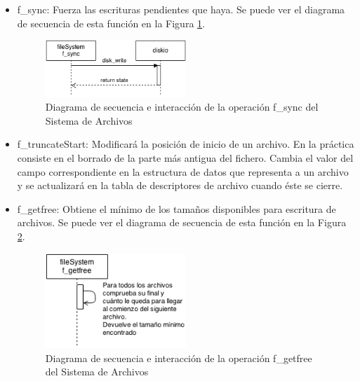 \begin{itemize}
\item f\_sync: Fuerza las escrituras pendientes que haya. Se puede ver el diagrama de secuencia de esta función en la Figura \ref{fig:fsync}.\\

\begin{figure}[!h]
\begin{center}
\includegraphics[width=0.5\textwidth]{figs/fsync.png}
\caption{Diagrama de secuencia e interacción de la operación f\_sync del Sistema de Archivos}
\label{fig:fsync}
\end{center}
\end{figure}

\item f\_truncateStart: Modificará la posición de inicio de un archivo. En la práctica consiste en el borrado de la parte más antigua del fichero. Cambia el valor del campo correspondiente en la estructura de datos que representa a un archivo y se actualizará en la tabla de descriptores de archivo cuando éste se cierre.\\


\item f\_getfree: Obtiene el mínimo de los tamaños disponibles para escritura de archivos. Se puede ver el diagrama de secuencia de esta función en la Figura \ref{fig:fgetfree}.\\

\begin{figure}[!h]
\begin{center}
\includegraphics[width=0.5\textwidth]{figs/fgetfree.png}
\caption{Diagrama de secuencia e interacción de la operación f\_getfree del Sistema de Archivos}
\label{fig:fgetfree}
\end{center}
\end{figure}


\end{itemize}
